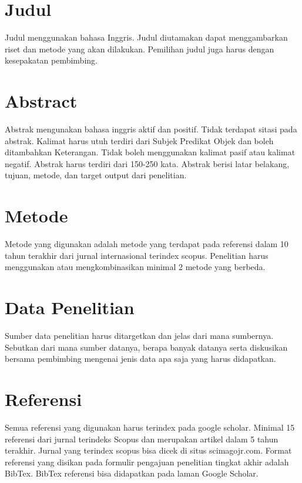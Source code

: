 \section{Judul}
Judul menggunakan bahasa Inggris. Judul diutamakan dapat menggambarkan riset dan metode yang akan dilakukan. Pemilihan judul juga harus dengan kesepakatan pembimbing. 

\section{Abstract}
Abstrak mengunakan bahasa inggris aktif dan positif. Tidak terdapat sitasi pada abstrak. Kalimat harus utuh terdiri dari Subjek Predikat Objek dan boleh ditambahkan Keterangan. Tidak boleh menggunakan kalimat pasif atau kalimat negatif. Abstrak harus terdiri dari 150-250 kata. Abstrak berisi latar belakang, tujuan, metode, dan target output dari penelitian.

\section{Metode}
Metode yang digunakan adalah metode yang terdapat pada referensi dalam 10 tahun terakhir dari jurnal internasional terindex scopus. Penelitian harus menggunakan atau mengkombinasikan minimal 2 metode yang berbeda.

\section{Data Penelitian}
Sumber data penelitian harus ditargetkan dan jelas dari mana sumbernya. Sebutkan dari mana sumber datanya, berapa banyak datanya serta diskusikan bersama pembimbing mengenai jenis data apa saja yang harus didapatkan. 

\section{Referensi}
Semua referensi yang digunakan harus terindex pada google scholar. Minimal 15 referensi dari jurnal terindeks Scopus dan merupakan artikel dalam 5 tahun terakhir. Jurnal yang terindex scopus bisa dicek di situs scimagojr.com. Format referensi yang disikan pada formulir pengajuan penelitian tingkat akhir adalah BibTex. BibTex referensi bisa didapatkan pada laman Google Scholar.
